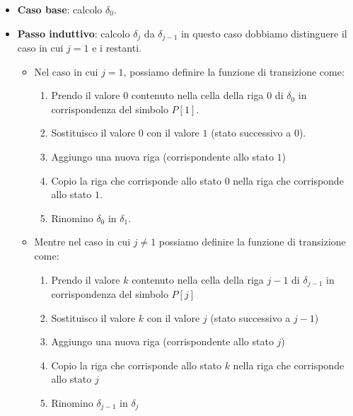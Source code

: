 \begin{itemize}
    \item \textbf{Caso base}: calcolo $\delta_0$.
    \item \textbf{Passo induttivo}: calcolo $\delta_j$ da $\delta_{j - 1}$ in
          questo caso dobbiamo distinguere il caso in cui $j = 1$ e i restanti.
          \begin{itemize}
              \item Nel caso in cui $j = 1$, possiamo definire la funzione di
                    transizione come:
                    \begin{enumerate}
                        \item Prendo il valore $0$ contenuto nella cella della
                              riga $0$ di $\delta_0$ in corrispondenza del
                              simbolo $P[1]$.
                        \item Sostituisco il valore $0$ con il valore $1$ (stato
                              successivo a $0$).
                        \item Aggiungo una nuova riga (corrispondente allo stato $1$)
                        \item Copio la riga che corrisponde allo stato 0 nella riga
                              che corrisponde allo stato $1$.
                        \item Rinomino $\delta_0$ in $\delta_1$.
                    \end{enumerate}
              \item Mentre nel caso in cui $j \neq 1$ possiamo definire la
                    funzione di transizione come:
                    \begin{enumerate}
                        \item Prendo il valore $k$ contenuto nella cella della
                              riga $j-1$ di $\delta_{j-1}$ in corrispondenza del
                              simbolo $P[j]$
                        \item Sostituisco il valore $k$ con il valore $j$ (stato
                              successivo a $j - 1$)
                        \item Aggiungo una nuova riga (corrispondente allo stato $j$)
                        \item Copio la riga che corrisponde allo stato $k$ nella
                              riga che corrisponde allo stato $j$
                        \item Rinomino $\delta_{j-1}$ in $\delta_j$
                    \end{enumerate}
          \end{itemize}
\end{itemize}

